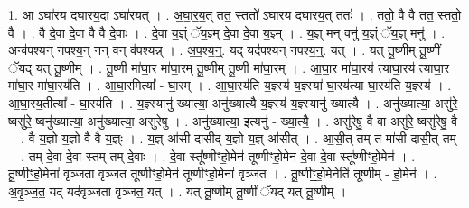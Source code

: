 \documentclass[17pt]{extarticle}
\begin{document}
1. आ ऽघा॑रय दघारय॒दा ऽघा॑रयत् । . अ॒घा॒र॒य॒त् तत॒ स्ततो॑ ऽघारय दघारय॒त् ततः॑ । . ततो॒ वै वै तत॒ स्ततो॒ वै । . वै दे॒वा दे॒वा वै वै दे॒वाः । . दे॒वा य॒ज्ञ्ं ॅय॒ज्ञ्म् दे॒वा दे॒वा य॒ज्ञ्म् । . य॒ज्ञ् मन् वनु॑ य॒ज्ञ्ं ॅय॒ज्ञ् मनु॑ । . अन्व॑पश्यन् नपश्य॒न् नन् वन् व॑पश्यन्न् । . अ॒प॒श्य॒न्॒. यद् यद॑पश्यन् नपश्य॒न्॒. यत् । . यत् तू॒ष्णीम् तू॒ष्णीं ॅयद् यत् तू॒ष्णीम् । . तू॒ष्णी मा॑घा॒र मा॑घा॒रम् तू॒ष्णीम् तू॒ष्णी मा॑घा॒रम् । . आ॒घा॒र मा॑घा॒रय॑ त्याघा॒रय॑ त्याघा॒र मा॑घा॒र मा॑घा॒रय॑ति । . आ॒घा॒रमित्या᳚ - घा॒रम् । . आ॒घा॒रय॑ति य॒ज्ञ्स्य॑ य॒ज्ञ्स्या॑ घा॒रय॑त्या घा॒रय॑ति य॒ज्ञ्स्य॑ । . आ॒घा॒रय॒तीत्या᳚ - घा॒रय॑ति । . य॒ज्ञ्स्यानु॑ ख्यात्या॒ अनु॑ख्यात्यै य॒ज्ञ्स्य॑ य॒ज्ञ्स्यानु॑ ख्यात्यै । . अनु॑ख्यात्या॒ असु॑रे॒ ष्वसु॑रे॒ ष्वनु॑ख्यात्या॒ अनु॑ख्यात्या॒ असु॑रेषु । . अनु॑ख्यात्या॒ इत्यनु॑ - ख्या॒त्यै॒ । . असु॑रेषु॒ वै वा असु॑रे॒ ष्वसु॑रेषु॒ वै । . वै य॒ज्ञो य॒ज्ञो वै वै य॒ज्ञ्ः । . य॒ज्ञ् आ॑सी दासीद् य॒ज्ञो य॒ज्ञ् आ॑सीत् । . आ॒सी॒त् तम् त मा॑सी दासी॒त् तम् । . तम् दे॒वा दे॒वा स्तम् तम् दे॒वाः । . दे॒वा स्तू᳚ष्णीꣳहो॒मेन॑ तूष्णीꣳहो॒मेन॑ दे॒वा दे॒वा स्तू᳚ष्णीꣳहो॒मेन॑ । . तू॒ष्णीꣳ॒॒हो॒मेना॑ वृञ्जता वृञ्जत तूष्णीꣳहो॒मेन॑ तूष्णीꣳहो॒मेना॑ वृञ्जत । . तू॒ष्णीꣳ॒॒हो॒मेनेति॑ तूष्णीम् - हो॒मेन॑ । . अ॒वृ॒ञ्ज॒त॒ यद् यद॑वृञ्जता वृञ्जत॒ यत् । . यत् तू॒ष्णीम् तू॒ष्णीं ॅयद् यत् तू॒ष्णीम् । \newline
\end{document}
